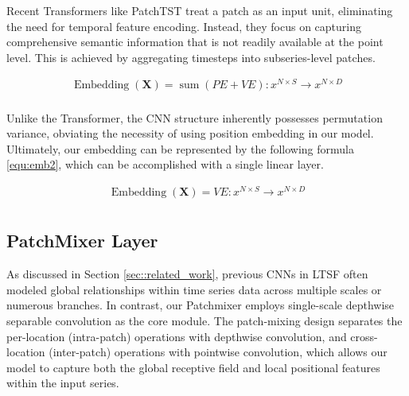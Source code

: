 \documentclass{article} \usepackage{iclr2024_conference,times}
\begin{document}
Recent Transformers like PatchTST treat a patch as an input unit, eliminating the need for temporal feature encoding. Instead, they focus on capturing comprehensive semantic information that is not readily available at the point level. This is achieved by aggregating timesteps into subseries-level patches.

 \begin{equation}\label{equ:emb1}
  \begin{split}
\operatorname{Embedding}(\mathbf{X})=\operatorname{sum}(PE +VE): x^{N \times S} \rightarrow x^{N \times D}\\
  \end{split}
\end{equation}

Unlike the Transformer, the CNN structure inherently possesses permutation variance, obviating the necessity of using position embedding in our model. Ultimately, our embedding can be represented by the following formula \ref{equ:emb2}, which can be accomplished with a single linear layer.

 \begin{equation}\label{equ:emb2}
  \begin{split}
\operatorname{Embedding}(\mathbf{X})=VE: x^{N \times S} \rightarrow x^{N \times D}\\
  \end{split}
\end{equation}



\subsection{PatchMixer Layer}

As discussed in Section \ref{sec::related_work}, previous CNNs in LTSF often modeled global relationships within time series data across multiple scales or numerous branches. In contrast, our Patchmixer employs single-scale depthwise separable convolution as the core module. The patch-mixing design separates the per-location (intra-patch) operations with depthwise convolution, and cross-location (inter-patch) operations with pointwise convolution, which allows our model to capture both the global receptive field and local positional features within the input series.
\end{document}
